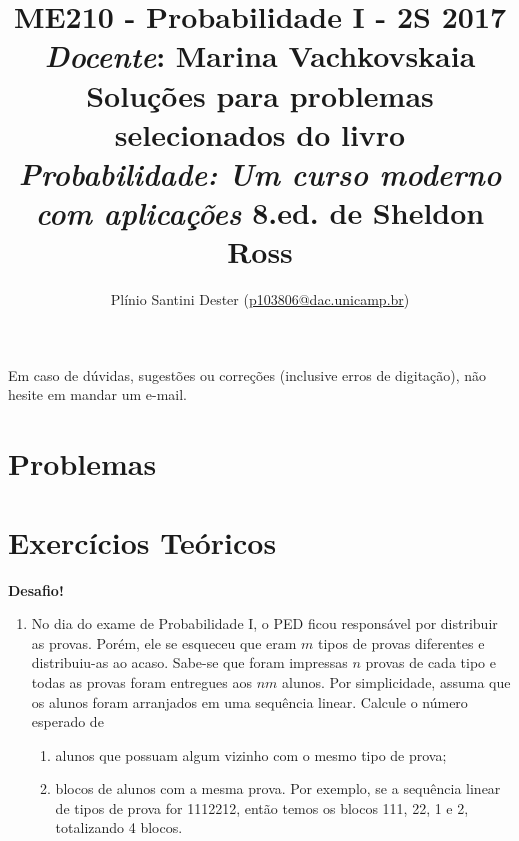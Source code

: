 


\title{	ME210 - Probabilidade I - 2S 2017\\
		{\large \textit{Docente}: Marina Vachkovskaia}\\[2mm]
		{\large Soluções para problemas selecionados do livro\\[-2mm]
        \textit{Probabilidade: Um curso moderno com aplicações}
        8.ed. de Sheldon Ross}\\
}
\author{Plínio Santini Dester (\url{p103806@dac.unicamp.br})}



\maketitle

Em caso de dúvidas, sugestões ou correções (inclusive erros de digitação), não hesite em mandar um e-mail.

\setcounter{section}{3}
\section{Problemas}

\newpage

\setcounter{section}{3}
\section{Exercícios Teóricos}


\vspace{10mm} {\LARGE \textbf{Desafio!}}
\begin{enumerate}
\item No dia do exame de Probabilidade I, o PED ficou responsável por distribuir as provas. Porém, ele se esqueceu que eram $m$ tipos de provas diferentes e distribuiu-as ao acaso. Sabe-se que foram impressas $n$ provas de cada tipo e todas as provas foram entregues aos $n m$ alunos. Por simplicidade, assuma que os alunos foram arranjados em uma sequência linear. Calcule o número esperado de
	\begin{enumerate}
	\item alunos que possuam algum vizinho com o mesmo tipo de prova;
    \item blocos de alunos com a mesma prova. Por exemplo, se a sequência linear de tipos de prova for 1112212, então temos os blocos 111, 22, 1 e 2, totalizando 4 blocos.
	\end{enumerate}
\end{enumerate}




